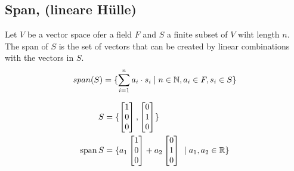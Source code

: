 \subsection{Span, (lineare Hülle)}
Let \(V\) be a vector space ofer a field \(F\) and \(S\) a finite subset of \(V\) wiht length \(n\). The span of \(S\) is the set of vectors that can be created by linear combinations with the vectors in \(S\).
\begin{equation}
    span(S) = \{
        \sum_{i=1}^{n} a_i \cdot s_i
     \mid n \in \mathbb{N}, a_i \in F, s_i \in S \}
\end{equation}
\begin{example}
    \begin{align*}
        S        & = \{
        \begin{bmatrix}
            1 \\ 0 \\ 0
        \end{bmatrix},
        \begin{bmatrix}
            0 \\ 1 \\ 0
        \end{bmatrix}
        \}                   \\
        \operatorname{span} S & =  \{
            a_1
            \begin{bmatrix}
                1 \\ 0 \\ 0
            \end{bmatrix} + a_2
            \begin{bmatrix}
                0 \\ 1 \\ 0
            \end{bmatrix}
            \
         \mid a_1, a_2 \in \mathbb{R} \}
    \end{align*}
\end{example}
